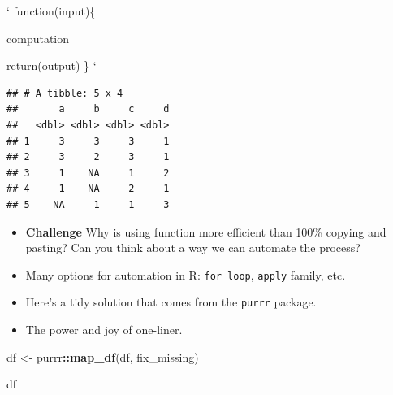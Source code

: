 \documentclass[
]{book}
\newenvironment{Shaded}{\begin{snugshade}}{\end{snugshade}}
\newcommand{\CommentTok}[1]{\textcolor[rgb]{0.56,0.35,0.01}{\textit{#1}}}
\newcommand{\ConstantTok}[1]{\textcolor[rgb]{0.56,0.35,0.01}{#1}}
\newcommand{\ControlFlowTok}[1]{\textcolor[rgb]{0.13,0.29,0.53}{\textbf{#1}}}
\newcommand{\DecValTok}[1]{\textcolor[rgb]{0.00,0.00,0.81}{#1}}
\newcommand{\FunctionTok}[1]{\textcolor[rgb]{0.13,0.29,0.53}{\textbf{#1}}}
\newcommand{\NormalTok}[1]{#1}
\newcommand{\OtherTok}[1]{\textcolor[rgb]{0.56,0.35,0.01}{#1}}
\newcommand{\SpecialCharTok}[1]{\textcolor[rgb]{0.81,0.36,0.00}{\textbf{#1}}}
\begin{document}
`
function(input)\{

computation

return(output)
\}
`

\begin{Shaded}
\end{Shaded}

\begin{verbatim}
## # A tibble: 5 x 4
##       a     b     c     d
##   <dbl> <dbl> <dbl> <dbl>
## 1     3     3     3     1
## 2     3     2     3     1
## 3     1    NA     1     2
## 4     1    NA     2     1
## 5    NA     1     1     3
\end{verbatim}

\begin{itemize}
\item
  \textbf{Challenge} Why is using function more efficient than 100\% copying and pasting? Can you think about a way we can automate the process?
\item
  Many options for automation in R: \texttt{for\ loop}, \texttt{apply} family, etc.
\item
  Here's a tidy solution that comes from the \texttt{purrr} package.
\item
  The power and joy of one-liner.
\end{itemize}

\begin{Shaded}
\begin{Highlighting}[]
\NormalTok{df }\OtherTok{\textless{}{-}}\NormalTok{ purrr}\SpecialCharTok{::}\FunctionTok{map\_df}\NormalTok{(df, fix\_missing)}

\NormalTok{df}
\end{Highlighting}
\end{Shaded}
\end{document}
